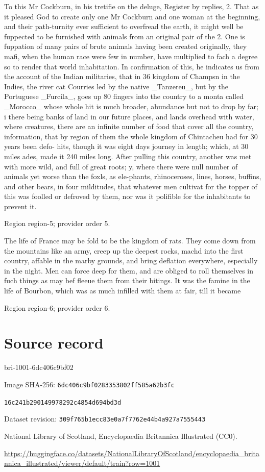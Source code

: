 \documentclass[11pt]{article}
\begin{document}
To this Mr Cockburn, in his tretifie on the deluge, Register by replies, 2. That as it pleased God to create only one Mr Cockburn and one woman at the beginning, and their path-turnity ever sufficient to overfread the earth, it might well be fuppected to be furnished with animals from an original pair of the 2. One is fuppation of many pairs of brute animals having been created originally, they mafi, when the human race were few in number, have multiplied to fach a degree so to render that world inhabitation. In confirmation of this, he indicates us from the account of the Indian militaries, that in 36 kingdom of Champsn in the Indies, the river cat Courries led by the native \_Tanzereu\_, but by the Portuguese \_Furcila\_, goes up 80 fingers into the country to a monta called \_Morocco\_ whose whole hit is much broader, abundance but not to drop by far; i there being banks of land in our future places, and lands overhead with water, where creatures, there are an infinite number of food that cover all the country, information, that by region of them the whole kingdom of Chintacheu had for 30 years been defo- hits, though it was eight days journey in length; which, at 30 miles ades, made it 240 miles long. After pulling this country, another was met with more wild, and full of great roots; y, where there were null number of animals yet worse than the foxls, as ele-phants, rhinoceroses, lines, horses, buffins, and other bears, in four milditudes, that whatever men cultivat for the topper of this was foolled or defroved by them, nor was it polifible for the inhabitants to prevent it.
\par

{\scriptsize\color{gray} Region region-5; provider order 5.\par}
\medskip

The life of France may be fold to be the kingdom of rats. They come down from the mountains like an army, creep up the deepest rocks, machd into the first country, affable in the marby grounds, and bring deflation everywhere, especially in the night. Men can force deep for them, and are obliged to roll themselves in fuch things as may bef fleeue them from their bitings. It was the famine in the life of Bourbon, which was as much infilled with them at fair, till it became
\par

{\scriptsize\color{gray} Region region-6; provider order 6.\par}
\medskip
\newpage\section*{Source record}
bri-1001-6dc406c9bf02\par
Image SHA-256: \texttt{6dc406c9bf0283353802ff585a62b3fc}\par\texttt{16c241b290149978292c4854d694bd3d}\par
Dataset revision: \texttt{309f765b1ecc83e0a7f7}\texttt{762e44b4a927a7555443}\par
National Library of Scotland, Encyclopaedia Britannica Illustrated (CC0).\par
\url{https://huggingface.co/datasets/NationalLibraryOfScotland/encyclopaedia_britannica_illustrated/viewer/default/train?row=1001}
\end{document}
